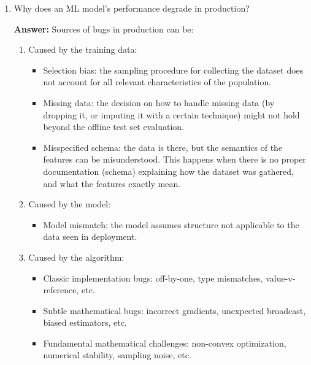 \documentclass{article}
\newenvironment{QandA}{\begin{enumerate}[label=\arabic*.]}{\end{enumerate}}
\newenvironment{ListAlph}{\begin{enumerate}[label=(\alph*)]}{\end{enumerate}}
\newenvironment{answer}{\par\normalfont \textbf{Answer:}}{}
\begin{document}
\begin{QandA}
    \item Why does an ML model’s performance degrade in production?
    \begin{answer}
        Sources of bugs in production can be:
        \begin{ListAlph}
            \item Caused by the training data:
            \begin{itemize}
                \item Selection bias: the sampling procedure for collecting the dataset does not account for all relevant characteristics of the population. 
                \item Missing data: the decision on how to handle missing data (by dropping it, or imputing it with a certain technique) might not hold beyond the offline test set evaluation.
                \item Misspecified schema: the data is there, but the semantics of the features can be misunderstood. This happens when there is no proper documentation (schema) explaining how the dataset was gathered, and what the features exactly mean.
            \end{itemize}
            
            \item Caused by the model:
            \begin{itemize}
                \item Model mismatch: the model assumes structure not applicable to the data seen in deployment.
            \end{itemize}

            \item Caused by the algorithm:
            \begin{itemize}
                \item Classic implementation bugs: off-by-one, type mismatches, value-v-reference, etc.
                \item Subtle mathematical bugs: incorrect gradients, unexpected broadcast, biased estimators, etc.
                \item Fundamental mathematical challenges: non-convex optimization, numerical stability, sampling noise, etc.
            \end{itemize}


\end{ListAlph}
\end{answer}
\end{QandA}
\end{document}
